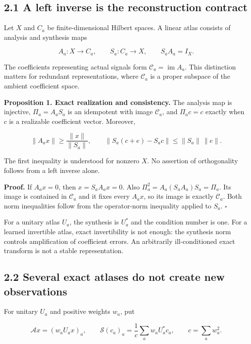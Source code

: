 \subsection{2.1 A left inverse is the reconstruction
contract}\label{LSM:a-left-inverse-is-the-reconstruction-contract}

Let \(X\) and \(C_a\) be finite-dimensional Hilbert spaces. A linear
atlas consists of analysis and synthesis maps

\[
A_a:X\longrightarrow C_a,\qquad S_a:C_a\longrightarrow X,
\qquad S_aA_a=I_X.
\]

The coefficients representing actual signals form
\(\mathcal C_a=\operatorname{im}A_a\). This distinction matters for
redundant representations, where \(\mathcal C_a\) is a proper subspace
of the ambient coefficient space.

\textbf{Proposition 1. Exact realization and consistency.} The analysis
map is injective, \(\Pi_a=A_aS_a\) is an idempotent with image
\(\mathcal C_a\), and \(\Pi_ac=c\) exactly when \(c\) is a realizable
coefficient vector. Moreover,

\[
\|A_ax\|\geq \frac{\|x\|}{\|S_a\|},\qquad
\|S_a(c+e)-S_ac\|\leq\|S_a\|\,\|e\|.
\]

The first inequality is understood for nonzero \(X\). No assertion of
orthogonality follows from a left inverse alone.

\textbf{Proof.} If \(A_ax=0\), then \(x=S_aA_ax=0\). Also
\(\Pi_a^2=A_a(S_aA_a)S_a=\Pi_a\). Its image is contained in
\(\mathcal C_a\) and it fixes every \(A_ax\), so its image is exactly
\(\mathcal C_a\). Both norm inequalities follow from the operator-norm
inequality applied to \(S_a\). \(\square\)

For a unitary atlas \(U_a\), the synthesis is \(U_a^*\) and the
condition number is one. For a learned invertible atlas, exact
invertibility is not enough: the synthesis norm controls amplification
of coefficient errors. An arbitrarily ill-conditioned exact transform is
not a stable representation.

\subsection{2.2 Several exact atlases do not create new
observations}\label{LSM:several-exact-atlases-do-not-create-new-observations}

For unitary \(U_a\) and positive weights \(w_a\), put

\[
\mathcal Ax=(w_aU_ax)_a,\qquad
\mathcal S(c_a)_a=\frac{1}{c}\sum_aw_aU_a^*c_a,
\qquad c=\sum_aw_a^2.
\]

